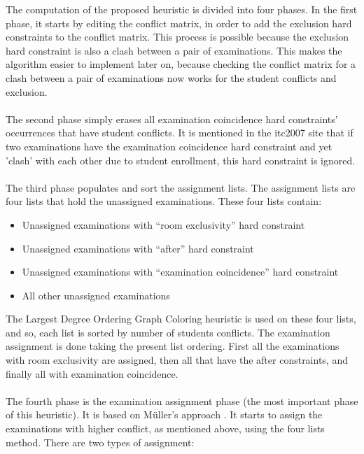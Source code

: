 The computation of the proposed heuristic is divided into four phases. In the first phase, it starts by editing the conflict matrix, in order to add the exclusion hard constraints to the conflict matrix. This process is possible because the exclusion hard constraint is also a clash between a pair of examinations. This makes the algorithm easier to implement later on, because checking the conflict matrix for a clash between a pair of examinations now works for the student conflicts and exclusion.\\
\\
The second phase simply erases all examination coincidence hard constraints' occurrences that have student conflicts. It is mentioned in the \gls{itc2007} site \cite{McCollum2007d} that if two examinations have the examination coincidence hard constraint and yet 'clash' with each other due to student enrollment, this hard constraint is ignored.\\
\\
The third phase populates and sort the assignment lists. The assignment lists are four lists that hold the unassigned examinations. These four lists contain:
\begin{itemize}
	\item Unassigned examinations with ``room exclusivity'' hard constraint
	\item Unassigned examinations with ``after'' hard constraint
	\item Unassigned examinations with ``examination coincidence'' hard constraint
	\item All other unassigned examinations
\end{itemize}
The Largest Degree Ordering Graph Coloring heuristic is used on these four lists, and so, each list is sorted by number of students conflicts. The examination assignment is done taking the present list ordering. First all the examinations with room exclusivity are assigned, then all that have the after constraints, and finally all with examination coincidence.\\
\\
The fourth phase is the examination assignment phase (the most important phase of this heuristic). It is based on M\"{u}ller's approach \cite{Mueller2009}. It starts to assign the examinations with higher conflict, as mentioned above, using the four lists method. There are two types of assignment:
\\
